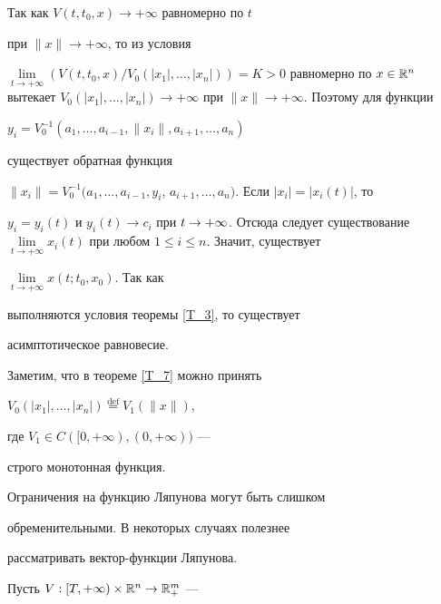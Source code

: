 \begin{pf}
Так как $V(t,t_{0},x)\rightarrow +\infty$ равномерно по $t$


при $\|x\|\rightarrow


+\infty$, то из условия


$\lim\limits_{t\rightarrow +\infty}


(V(t,t_{0},x)/V_{0}(|x_{1}|,\dotsc,|x_{n}|))=K>0$ равномерно по $x\in


\R^{n}$ вытекает $V_{0}(|x_{1}|,\dotsc,|x_{n}|)\rightarrow


+\infty$ при $\|x\|\rightarrow +\infty$. Поэтому для функции


$y_{i}=V_{0}^{-1}(a_{1},\dotsc,a_{i- 1},\|x_{i}\|,a_{i+1},\dotsc,a_{n})$


существует обратная функция


$\|x_{i}\|=V_{0}^{-1}(a_{1},\dotsc,a_{i- 1},


y_{i}$, $a_{i+1},\dotsc,a_{n})$. Если $|x_{i}|=|x_{i}(t)|$, то




$y_{i}=y_{i}(t)$ и $y_{i}(t)\rightarrow c_{i}$ при $t\rar


+\infty$. Отсюда следует существование $\lim\limits_{t\rightarrow


+\infty} x_{i}(t)$ при любом $1\leq i \leq n$. Значит, существует


$\lim\limits_{t\rightarrow +\infty} x(t;t_{0},x_{0})$. Так как


выполняются условия теоремы \ref{T_3}, то существует


асимптотическое равновесие.


\end{pf}





Заметим, что в теореме \ref{T_7} можно принять


$V_{0}(|x_{1}|,\dotsc,|x_{n}|)\overset{\text{def}}{=}{}V_{1}(\|x\|)$,


где $V_{1}\in C([0,+\infty),(0,+\infty))$ ---


строго монотонная функция.





Ограничения на функцию Ляпунова могут быть слишком


обременительными. В некоторых случаях полезнее


рассматривать вектор-функции Ляпунова.


Пусть $V:[T,+\infty)\times {\Bbb R}^{n} \rightarrow {\Bbb R}_{+}^{m}$ ---


